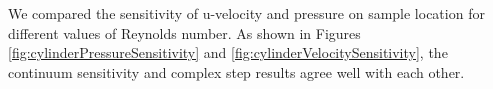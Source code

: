 \documentclass[12pt]{aiaa-pretty}
\begin{document}
We compared the sensitivity of u-velocity and pressure on sample location for different values of Reynolds number. As shown in Figures \ref{fig:cylinderPressureSensitivity} and \ref{fig:cylinderVelocitySensitivity}, the continuum sensitivity and complex step results agree well with each other.

%
\begin{figure}[H]
	\centering
	\quad
	\\
	\quad
	\\

\end{figure}
\end{document}
